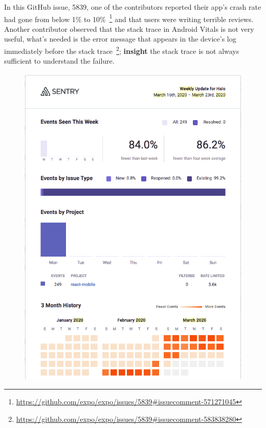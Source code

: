In this GitHub issue, 5839, one of the contributors reported their app's crash rate had gone from below 1\% to 10\%~\footnote{\url{https://github.com/expo/expo/issues/5839\#issuecomment-571271045}} and that users were writing terrible reviews. Another contributor observed that the stack trace in Android Vitals is not very useful, what's needed is the error message that appears in the device's log immediately before the stack trace~\footnote{\url{https://github.com/expo/expo/issues/5839\#issuecomment-583838280}}; 
\textbf{insight} the stack trace is not always sufficient to understand the failure\label{insight-expo-stack-trace-not-sufficient-to-identify-the-failure}.

\begin{figure}[htbp!]
\centering
\begin{minipage}{.45\textwidth}
  \centering
  \includegraphics[width=\textwidth]{images/localhalo/sentry-weekly-report-16-mar-2020.png}

\end{minipage}
\end{figure}
